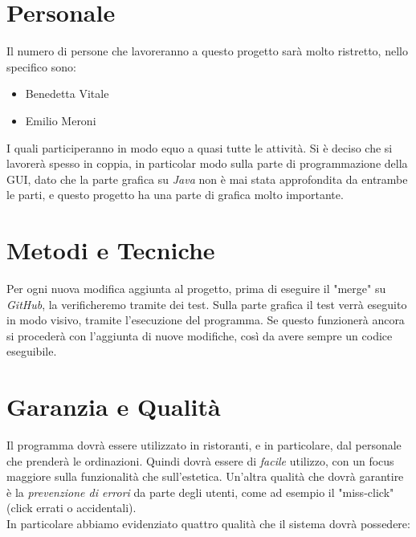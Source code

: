 \documentclass[12pt, letterpaper]{book}
\begin{document}
\section{Personale}
Il numero di persone che lavoreranno a questo progetto sarà molto ristretto, nello specifico sono:
\begin{itemize}
    \item Benedetta Vitale
    \item Emilio Meroni
\end{itemize}
I quali participeranno in modo equo a quasi tutte le attività. Si è deciso che si lavorerà spesso in coppia, in particolar modo sulla parte di programmazione della GUI, dato che la parte grafica su \textit{Java} non è mai stata approfondita da entrambe le parti, e questo progetto ha una parte di grafica molto importante.


\section{Metodi e Tecniche}

Per ogni nuova modifica aggiunta al progetto, prima di eseguire il "merge" su \textit{GitHub}, la verificheremo tramite dei test. Sulla parte grafica il test verrà eseguito in modo visivo, tramite l'esecuzione del programma.
Se questo funzionerà ancora si procederà con l'aggiunta di nuove modifiche, così da avere sempre un codice eseguibile.

\section{Garanzia e Qualità}

Il programma dovrà essere utilizzato in ristoranti, e in particolare, dal personale che prenderà le ordinazioni. Quindi dovrà essere di \textit{facile} utilizzo, con un focus maggiore sulla funzionalità che sull'estetica. Un'altra qualità che dovrà garantire è la \textit{prevenzione di errori} da parte degli utenti, come ad esempio il "miss-click" (click errati o accidentali).\\

In particolare abbiamo evidenziato quattro qualità che il sistema dovrà possedere:
\end{document}
